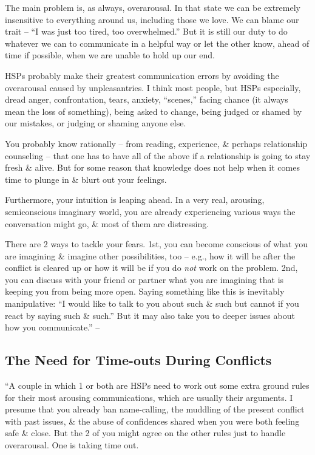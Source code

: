 \documentclass{article}
\numberwithin{equation}{section}
\begin{document}
The main problem is, as always, overarousal. In that state we can be extremely insensitive to everything around us, including those we love. We can blame our trait -- ``I was just too tired, too overwhelmed.'' But it is still our duty to do whatever we can to communicate in a helpful way or let the other know, ahead of time if possible, when we are unable to hold up our end.

HSPs probably make their greatest communication errors by avoiding the overarousal caused by unpleasantries. I think most people, but HSPs especially, dread anger, confrontation, tears, anxiety, ``scenes,'' facing chance (it always mean the loss of something), being asked to change, being judged or shamed by our mistakes, or judging or shaming anyone else.

You probably know rationally -- from reading, experience, \& perhaps relationship counseling -- that one has to have all of the above if a relationship is going to stay fresh \& alive. But for some reason that knowledge does not help when it comes time to plunge in \& blurt out your feelings.

Furthermore, your intuition is leaping ahead. In a very real, arousing, semiconscious imaginary world, you are already experiencing various ways the conversation might go, \& most of them are distressing.

There are 2 ways to tackle your fears. 1st, you can become conscious of what you are imagining \& imagine other possibilities, too -- e.g., how it will be after the conflict is cleared up or how it will be if you do \textit{not} work on the problem. 2nd, you can discuss with your friend or partner what you are imagining that is keeping you from being more open. Saying something like this is inevitably manipulative: ``I would like to talk to you about such \& such but cannot if you react by saying such \& such.'' But it may also take you to deeper issues about how you communicate.'' -- \cite[pp. 187--188]{Aron2013}

\subsection{The Need for Time-outs During Conflicts}
``A couple in which 1 or both are HSPs need to work out some extra ground rules for their most arousing communications, which are usually their arguments. I presume that you already ban name-calling, the muddling of the present conflict with past issues, \& the abuse of confidences shared when you were both feeling safe \& close. But the 2 of you might agree on the other rules just to handle overarousal. One is taking time out.
\end{document}
